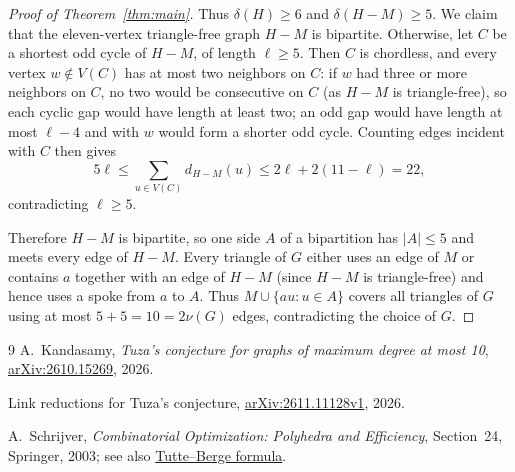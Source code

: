 \documentclass[11pt]{article}
\begin{document}
\begin{proof}[Proof of Theorem~\ref{thm:main}]
Thus $\delta(H)\geq 6$ and $\delta(H-M)\geq 5$. We claim that the eleven-vertex triangle-free graph $H-M$ is bipartite. Otherwise, let $C$ be a shortest odd cycle of $H-M$, of length $\ell\geq 5$. Then $C$ is chordless, and every vertex $w\notin V(C)$ has at most two neighbors on $C$: if $w$ had three or more neighbors on $C$, no two would be consecutive on $C$ (as $H-M$ is triangle-free), so each cyclic gap would have length at least two; an odd gap would have length at most $\ell-4$ and with $w$ would form a shorter odd cycle. Counting edges incident with $C$ then gives
\[
5\ell \leq \sum_{u\in V(C)} d_{H-M}(u) \leq 2\ell + 2(11-\ell) = 22,
\]
contradicting $\ell\geq 5$.

Therefore $H-M$ is bipartite, so one side $A$ of a bipartition has $|A|\leq 5$ and meets every edge of $H-M$. Every triangle of $G$ either uses an edge of $M$ or contains $a$ together with an edge of $H-M$ (since $H-M$ is triangle-free) and hence uses a spoke from $a$ to $A$. Thus $M\cup\{au : u\in A\}$ covers all triangles of $G$ using at most $5+5=10=2\nu(G)$ edges, contradicting the choice of $G$.
\end{proof}

\begin{thebibliography}{9}
A.~Kandasamy, \emph{Tuza's conjecture for graphs of maximum degree at most 10},
\href{https://arxiv.org/abs/2610.15269}{arXiv:2610.15269}, 2026.

Link reductions for Tuza's conjecture,
\href{https://arxiv.org/html/2611.11128v1}{arXiv:2611.11128v1}, 2026.

A.~Schrijver, \emph{Combinatorial Optimization: Polyhedra and Efficiency},
Section~24, Springer, 2003; see also \href{https://ir.cwi.nl/pub/10149/10149D.pdf}{Tutte--Berge formula}.
\end{thebibliography}
\end{document}

